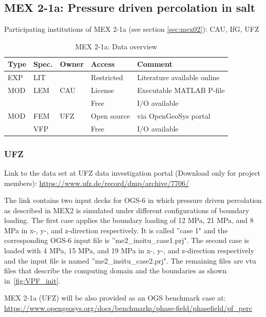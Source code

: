 \subsection{MEX 2-1a: Pressure driven percolation in salt}

Participating institutions of MEX 2-1a (see section \ref{sec:mex02}): CAU, IfG, UFZ

\begin{table}[ht!]
\caption{MEX 2-1a: Data overview}
\label{tab:dms-mex21a-overview}
\small
\begin{tabular}{l|l|l|l|L{4.7cm}}
\hline
{}
Type & Spec. & Owner & Access     & Comment                       \\ 
\hline 
EXP  & LIT   & \cite{Kamlot2009} & Restricted & Literature available online \\
\hline \hline
MOD  & LEM   & CAU   & License    & Executable MATLAB P-file      \\
     &       &       & Free       & I/O available                 \\
\hline
MOD  & FEM   & UFZ   & Open source & via OpenGeoSys portal        \\
     & VFP   &       & Free        & I/O available                \\
%
\hline
\end{tabular}
\end{table}
\normalsize

\subsubsection*{UFZ}

Link to the data set at UFZ data investigation portal (Download only for project members):
\url{https://www.ufz.de/record/dmp/archive/7706/}

The link contains two input decks for OGS-6 in which pressure driven percolation as described in MEX2 is simulated under different configurations of boundary loading.
The first case applies the boundary loading of 12 MPa, 21 MPa, and 8 MPa in x-, y-, and z-direction respectively. It is called ''case 1" and the corresponding OGS-6 input file is ''me2\_insitu\_case1.prj".
The second case is loaded with 4 MPa, 15 MPa, and 19 MPa in x-, y-, and z-direction respectively and the input file is named ''me2\_insitu\_case2.prj".
The remaining files are vtu files that describe the computing domain and the boundaries as shown in~\ref{fig:VPF_init}.

MEX 2-1a (UFZ) will be also provided as an OGS benchmark case at:\\
\small
\url{https://www.opengeosys.org/docs/benchmarks/phase-field/phasefield/pf_perc}
\normalsize

